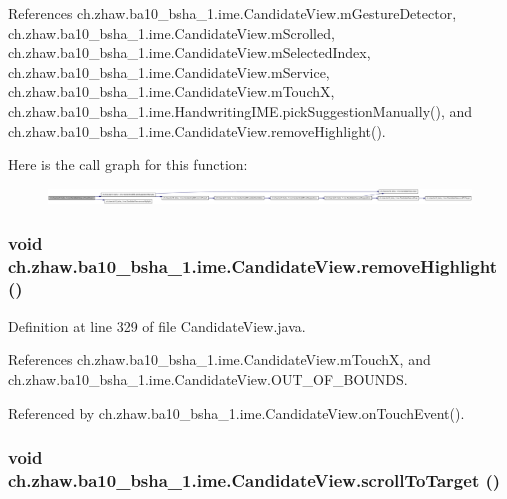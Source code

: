 References ch.zhaw.ba10\_\-bsha\_\-1.ime.CandidateView.mGestureDetector, ch.zhaw.ba10\_\-bsha\_\-1.ime.CandidateView.mScrolled, ch.zhaw.ba10\_\-bsha\_\-1.ime.CandidateView.mSelectedIndex, ch.zhaw.ba10\_\-bsha\_\-1.ime.CandidateView.mService, ch.zhaw.ba10\_\-bsha\_\-1.ime.CandidateView.mTouchX, ch.zhaw.ba10\_\-bsha\_\-1.ime.HandwritingIME.pickSuggestionManually(), and ch.zhaw.ba10\_\-bsha\_\-1.ime.CandidateView.removeHighlight().

Here is the call graph for this function:\nopagebreak
\begin{figure}[H]
\begin{center}
\leavevmode
\includegraphics[width=420pt]{classch_1_1zhaw_1_1ba10__bsha__1_1_1ime_1_1CandidateView_a726242422f3279f05a81283406fa9d4a_cgraph}
\end{center}
\end{figure}
\hypertarget{classch_1_1zhaw_1_1ba10__bsha__1_1_1ime_1_1CandidateView_a08f3ae896df1462fb9af1ffd5eeca266}{
\subsubsection[{removeHighlight}]{\setlength{\rightskip}{0pt plus 5cm}void ch.zhaw.ba10\_\-bsha\_\-1.ime.CandidateView.removeHighlight ()}}
\label{classch_1_1zhaw_1_1ba10__bsha__1_1_1ime_1_1CandidateView_a08f3ae896df1462fb9af1ffd5eeca266}


Definition at line 329 of file CandidateView.java.

References ch.zhaw.ba10\_\-bsha\_\-1.ime.CandidateView.mTouchX, and ch.zhaw.ba10\_\-bsha\_\-1.ime.CandidateView.OUT\_\-OF\_\-BOUNDS.

Referenced by ch.zhaw.ba10\_\-bsha\_\-1.ime.CandidateView.onTouchEvent().\hypertarget{classch_1_1zhaw_1_1ba10__bsha__1_1_1ime_1_1CandidateView_a300599eba91c613b0354b24f7414c1be}{
\subsubsection[{scrollToTarget}]{\setlength{\rightskip}{0pt plus 5cm}void ch.zhaw.ba10\_\-bsha\_\-1.ime.CandidateView.scrollToTarget ()}}
\label{classch_1_1zhaw_1_1ba10__bsha__1_1_1ime_1_1CandidateView_a300599eba91c613b0354b24f7414c1be}


